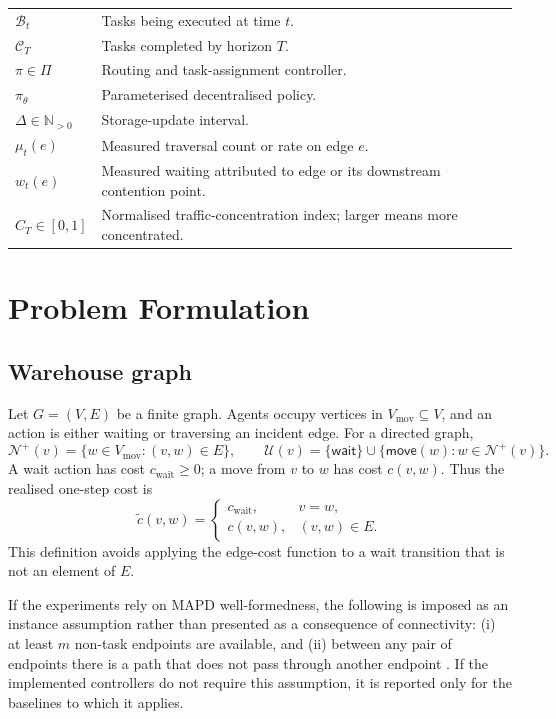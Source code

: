 \documentclass[../main.tex]{subfiles}
\begin{document}
\begin{table}[htbp]
\begin{tabularx}{\textwidth}{@{}lX@{}}
\(\mathcal{B}_t\) & Tasks being executed at time \(t\). \\
\(\mathcal{C}_T\) & Tasks completed by horizon \(T\). \\
\(\pi\in\Pi\) & Routing and task-assignment controller. \\
\(\pi_\theta\) & Parameterised decentralised policy. \\
\(\Delta\in\mathbb{N}_{>0}\) & Storage-update interval. \\
\(\mu_t(e)\) & Measured traversal count or rate on edge \(e\). \\
\(w_t(e)\) & Measured waiting attributed to edge or its downstream contention point. \\
\(C_T\in[0,1]\) & Normalised traffic-concentration index; larger means more concentrated. \\
\bottomrule
\end{tabularx}
\end{table}

\section{Problem Formulation}
\label{sec:problem-formulation}

\subsection{Warehouse graph}

Let \(G=(V,E)\) be a finite graph. Agents occupy vertices in
\(V_{\mathrm{mov}}\subseteq V\), and an action is either waiting or traversing
an incident edge. For a directed graph,
\[
\mathcal{N}^{+}(v)=\{w\in V_{\mathrm{mov}}:(v,w)\in E\},
\qquad
\mathcal{U}(v)=\{\mathsf{wait}\}\cup
\{\mathsf{move}(w):w\in\mathcal{N}^{+}(v)\}.
\]
A wait action has cost \(c_{\mathrm{wait}}\geq 0\); a move from \(v\) to \(w\)
has cost \(c(v,w)\). Thus the realised one-step cost is
\[
\widetilde c(v,w)=
\begin{cases}
 c_{\mathrm{wait}}, & v=w,\\
 c(v,w), & (v,w)\in E.
\end{cases}
\]
This definition avoids applying the edge-cost function to a wait transition
that is not an element of \(E\).

If the experiments rely on MAPD well-formedness, the following is imposed as an
instance assumption rather than presented as a consequence of connectivity:
(i) at least \(m\) non-task endpoints are available, and (ii) between any pair
of endpoints there is a path that does not pass through another endpoint
\cite{ma2017lifelong}. If the implemented controllers do not require this
assumption, it is reported only for the baselines to which it applies.
\end{document}
